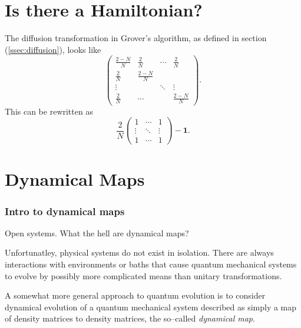 \section{Is there a Hamiltonian?}


The diffusion transformation in Grover's algorithm,
as defined in section (\ref{ssec:diffusion}), looks like
\begin{equation}
\begin{pmatrix}
    \frac{2-N}{N} & \frac{2}{N} & \cdots & \frac{2}{N} \\
    \frac{2}{N}   & \frac{2-N}{N} & &  \\
    \vdots &  & \ddots & \vdots \\
    \frac{2}{N}   & \cdots && \frac{2-N}{N} 
\end{pmatrix}.
\end{equation}
This can be rewritten as
\begin{equation}
\frac{2}{N}
\begin{pmatrix}
    1 & \cdots & 1 \\
    \vdots & \ddots & \vdots \\
    1 & \cdots & 1
\end{pmatrix}
- \textbf{1}.
\end{equation}


\section{Dynamical Maps}

\subsubsection{Intro to dynamical maps}
Open systems.
What the hell are dynamical maps?

Unfortunatley, physical systems do not exist in isolation.  There
are always interactions with environments or baths that cause
quantum mechanical systems to evolve by possibly more complicated
means than unitary transformations.

A somewhat more general approach to quantum evolution is to 
consider dynamical evolution of a quantum mechanical system
described as simply a map of density matrices to density
matrices, the so--called \emph{dynamical map}.

